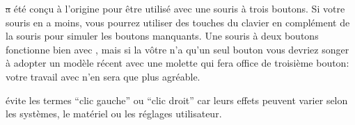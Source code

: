 \documentclass[a4paper,10pt,twoside]{book}
\begin{document}
\st a été conçu à l'origine pour être utilisé avec une souris à trois
boutons. Si votre souris en a moins, vous pourrez utiliser des touches
du clavier en complément de la souris pour simuler les boutons
manquants. Une souris à deux boutons fonctionne bien avec \pharo, mais si
la vôtre n'a qu'un seul bouton vous devriez songer à adopter un
modèle récent avec une molette qui fera office de troisième bouton: 
votre travail avec \pharo n'en sera que plus agréable.

\pharo évite les termes ``clic gauche'' ou ``clic droit'' car leurs
effets peuvent varier selon les systèmes, le matériel ou les
réglages utilisateur.
\end{document}
